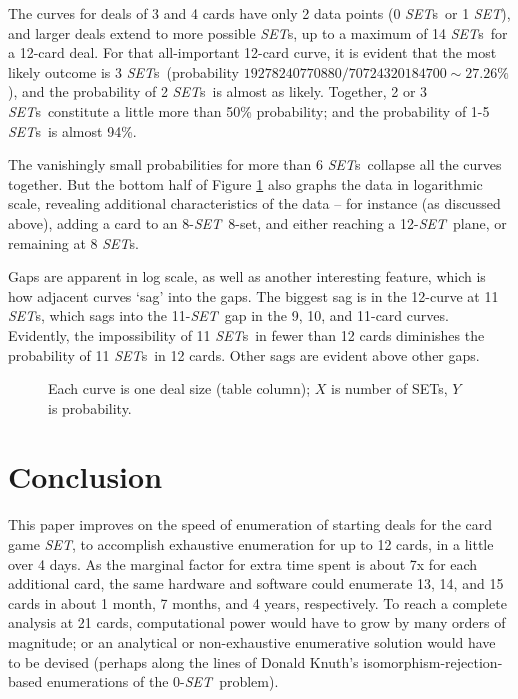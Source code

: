 \documentclass{article}
\theoremstyle{theorem}
\theoremstyle{definition}
\newcommand{\SET}{{\em SET}}
\newcommand{\SETs}{{\em SET}s}
\begin{document}
The curves for deals of 3 and 4 cards have only 2 data points (0 \SETs~or 1
\SET), and larger deals extend to more possible \SETs, up to a maximum of 14
\SETs~for a 12-card deal. For that all-important 12-card curve, it is evident
that the most likely outcome is 3 \SETs~(probability
$19278240770880/70724320184700\sim 27.26\%$), and the probability of 2 \SETs~is
almost as likely. Together, 2 or 3 \SETs~constitute a little more than 50\%
probability; and the probability of 1-5 \SETs~is almost 94\%.

The vanishingly small probabilities for more than 6 \SETs~collapse all the
curves together. But the bottom half of Figure \ref{FIGCOLS} also graphs the
data in logarithmic scale, revealing additional characteristics of the data --
for instance (as discussed above), adding a  card to an 8-\SET~8-set, and
either reaching a 12-\SET~plane, or remaining at 8 \SETs.

Gaps are apparent in log scale, as well as another interesting feature, which is
how adjacent curves `sag' into the gaps. The biggest sag is in the 12-curve at
11 \SETs, which sags into the 11-\SET~gap in the 9, 10, and 11-card
curves. Evidently, the impossibility of 11 \SETs~in fewer than 12 cards
diminishes the probability of 11 \SETs~in 12 cards. Other sags are evident above
other gaps.

\begin{figure}[!htb]
  \caption{\label{FIGCOLS} Each curve is one deal size (table column); $X$ is
    number of SETs, $Y$ is probability.}
\end{figure}

\section{Conclusion}
This paper improves on the speed of enumeration of starting deals for the card
game \SET, to accomplish exhaustive enumeration for up to 12 cards, in a little
over 4 days. As the marginal factor for extra time spent is about 7x for each
additional card, the same hardware and software could enumerate 13, 14, and 15
cards in about 1 month, 7 months, and 4 years, respectively. To reach a complete
analysis at 21 cards, computational power would have to grow by many orders of
magnitude; or an analytical or non-exhaustive enumerative solution would have to
be devised (perhaps along the lines of Donald Knuth's
isomorphism-rejection-based enumerations of the 0-\SET~problem).
\end{document}
